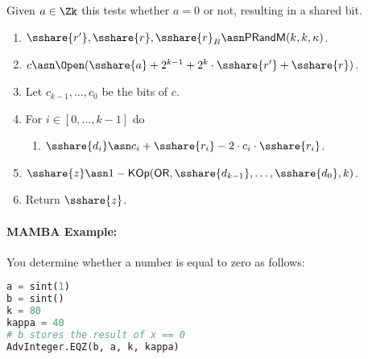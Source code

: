   Given $a \in \Zk$ this tests whether $a=0$ or not,
  resulting in a shared bit.
  \begin{enumerate}
    \item $\sshare{r'}, \sshare{r}, \sshare{r}_B \asn \mathsf{PRandM}(k,k,\kappa)$.
    \item $c \asn \Open(\sshare{a}+2^{k-1}+2^k \cdot \sshare{r'}+\sshare{r})$.
    \item Let $c_{k-1},\ldots,c_0$ be the bits of $c$.
    \item For $i \in [0,\ldots,k-1]$ do
          \begin{enumerate}
            \item $\sshare{d_i} \asn c_i+\sshare{r_i}-2 \cdot c_i \cdot \sshare{r_i}$.
          \end{enumerate}
    \item $\sshare{z} \asn 1- \mathsf{KOp}(\mathsf{OR},\sshare{d_{k-1}},\ldots,\sshare{d_0},k)$.
    \item Return $\sshare{z}$.
  \end{enumerate}

  \paragraph{MAMBA Example:} You determine whether a number is equal to zero as follows:
  \begin{lstlisting}[language={python}]
a = sint(1)
b = sint()
k = 80
kappa = 40
# b stores the result of x == 0
AdvInteger.EQZ(b, a, k, kappa)
\end{lstlisting}


